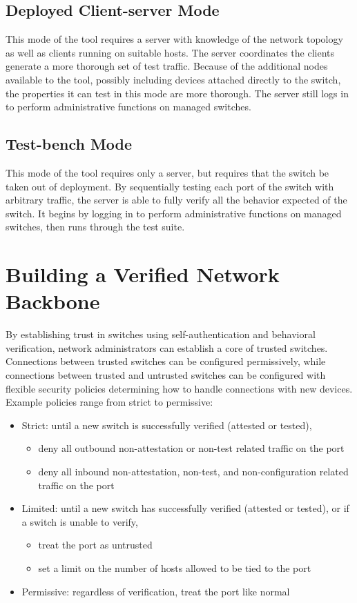 \documentclass[journal]{IEEEtran}
\begin{document}
\subsection{Deployed Client-server Mode}
This mode of the tool requires a server with knowledge of the network topology as well as clients
running on suitable hosts. The server coordinates the clients generate a more thorough set of test
traffic. Because of the additional nodes available to the tool, possibly including devices attached
directly to the switch, the properties it can test in this mode are more thorough. The server still
logs in to perform administrative functions on managed switches.

\subsection{Test-bench Mode}
This mode of the tool requires only a server, but requires that the switch be taken out of
deployment. By sequentially testing each port of the switch with arbitrary traffic, the server is
able to fully verify all the behavior expected of the switch. It begins by logging in to perform
administrative functions on managed switches, then runs through the test suite.


\section{Building a Verified Network Backbone} \label{sec:policies}
By establishing trust in switches using self-authentication and behavioral verification, network
administrators can establish a core of trusted switches. Connections between trusted switches can
be configured permissively, while connections between trusted and untrusted switches can be
configured with flexible security policies determining how to handle connections with new devices.
Example policies range from strict to permissive:
\begin{itemize}
  \item Strict: until a new switch is successfully verified (attested or tested),
  \begin{itemize}
    \item deny all outbound non-attestation or non-test related traffic on the port
    \item deny all inbound non-attestation, non-test, and non-configuration related traffic on the
    port
  \end{itemize}
  \item Limited: until a new switch has successfully verified (attested or tested), or if a switch
  is unable to verify,
  \begin{itemize}
    \item treat the port as untrusted
    \item set a limit on the number of hosts allowed to be tied to the port
  \end{itemize}
  \item Permissive: regardless of verification, treat the port like normal
\end{itemize}
\end{document}
